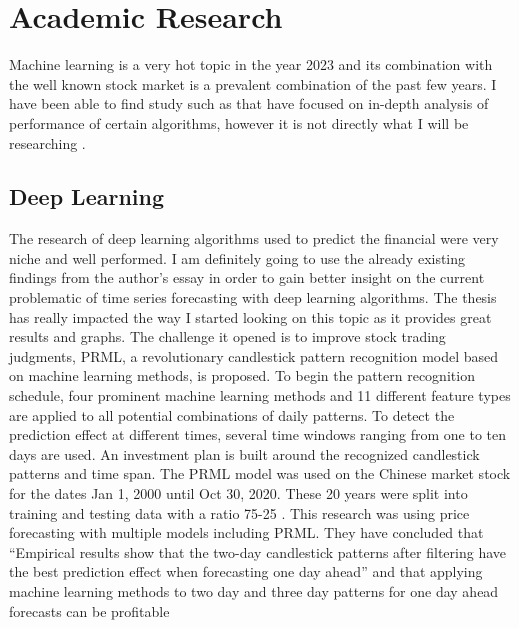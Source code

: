 \documentclass{imc-inf}
\begin{document}
	
	\section{Academic Research}
	Machine learning is a very hot topic in the year 2023 and its combination with the well known stock market is a prevalent combination
	of the past few years. I have been able to find study such as \cite{ref1}  that have focused on in-depth analysis of performance of certain algorithms,
	however it is not directly what I will be researching .
	
	
	\subsection{Deep Learning}
	The research of deep learning algorithms used to predict the financial \cite{deep_learning}
	were very niche and well performed. I am definitely going to use the already existing findings from the author's essay in order to gain better insight
	on the current problematic of time series forecasting with deep  learning algorithms. 
	The thesis \cite{prml} has really impacted the way I started looking on this topic as it provides great results and graphs.
	The challenge it opened is to improve stock trading judgments, PRML, a revolutionary candlestick pattern recognition model based on machine learning
	methods, is proposed. To begin the pattern recognition schedule, four prominent machine learning methods and 11 different feature types are applied 
	to all potential combinations of daily patterns. To detect the prediction effect at different times, several time windows ranging from one to ten days
	are used. An investment plan is built around the recognized candlestick patterns and time span.
	The PRML model was used on the Chinese market stock for the dates  Jan 1, 2000 until Oct 30, 2020. These 20 years were split into training
	and testing data with a ratio 75-25 . This research was using price forecasting with multiple models including PRML. They have concluded that 
	“Empirical results show that the two-day candlestick patterns after filtering have the best prediction effect when forecasting one day ahead”
	and that applying machine learning methods to two day and three day  patterns for one day ahead forecasts can be profitable
	
\end{document}
